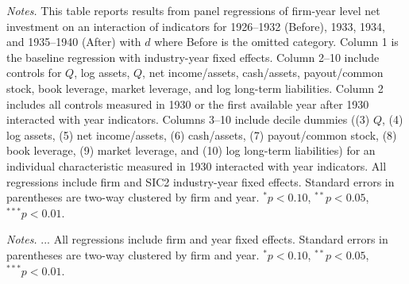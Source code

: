 \clearpage
\begin{table}[t!]\centering
\caption{\\ Gold clause exposure and net investment with controls} \scriptsize   
\label{tab:controls} \renewcommand{\arraystretch}{1.2}
\resizebox{1\textwidth}{!}{%


}

\vspace*{3mm} \justifying \noindent
\scriptsize{\textit{Notes.} This table reports results from panel regressions of firm-year level net investment on an interaction of indicators for 1926--1932 (Before), 1933, 1934, and 1935--1940 (After) with $d$ where Before is the omitted category. Column 1 is the baseline regression with industry-year fixed effects. Column 2--10 include controls for $Q$, log assets, $Q$, net income/assets, cash/assets, payout/common stock,   book leverage, market leverage, and log long-term liabilities. Column 2 includes all controls measured in 1930 or the first available year after 1930 interacted with year indicators. Columns 3--10 include decile dummies ((3) $Q$, (4) log assets, (5) net income/assets, (6) cash/assets, (7) payout/common stock, (8)  book leverage, (9) market leverage, and (10) log long-term liabilities) for an individual characteristic measured in 1930 interacted with year indicators. All regressions include firm and SIC2 industry-year fixed effects. Standard errors in parentheses are two-way clustered by firm and year. $^{*}p<0.10$, $^{**}p<0.05$, $^{***}p<0.01$.}
\end{table}

\begin{table}[p]\centering
\caption{\\ ... } \scriptsize   
\label{tab:...}  \renewcommand{\arraystretch}{1.2}

\resizebox{0.3\textheight}{!}{%

}

\vspace*{3mm} \justifying \noindent
\scriptsize{\textit{Notes.}  ... All regressions include firm and year fixed effects. Standard errors in parentheses are two-way clustered by firm and year. $^{*}p<0.10$, $^{**}p<0.05$, $^{***}p<0.01$.}
\end{table}

